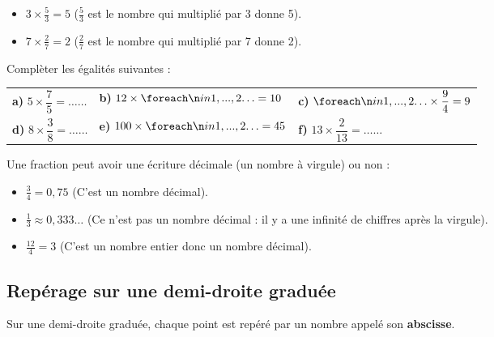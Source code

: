 \documentclass[a4paper]{book}
\begin{document}
    
    \begin{exemple}
        \begin{itemize}
            \item $3 \times \frac{5}{3} = 5$ \quad ($\frac{5}{3}$ est le nombre qui multiplié par 3 donne 5).
            \item $7 \times \frac{2}{7} = 2$ \quad ($\frac{2}{7}$ est le nombre qui multiplié par 7 donne 2).
        \end{itemize}
    \end{exemple}
    
        
    \begin{exemple}
        Complèter les égalités suivantes :
        
        \begin{center}
        \renewcommand{\arraystretch}{1.5}
        \begin{tabularx}{\textwidth}{XXX}
            \textbf{a)} $5 \times \dfrac{7}{5} = \dots\dots$ & \textbf{b)} $12 \times \points[2] = 10$ & \textbf{c)} $\points[2] \times \dfrac{9}{4} = 9$ \\[1ex]
            \textbf{d)} $8 \times \dfrac{3}{8} = \dots\dots$ & \textbf{e)} $100 \times \points[2] = 45$ & \textbf{f)} $13 \times \dfrac{2}{13} = \dots\dots$
        \end{tabularx}
        \end{center}
    \end{exemple}
    
    
    \begin{remarque}
        Une fraction peut avoir une écriture décimale (un nombre à virgule) ou non :
        \begin{itemize}
            \item $\frac{3}{4} = 0,75$ (C'est un nombre décimal).
            \item $\frac{1}{3} \approx 0,333\dots$ (Ce n'est pas un nombre décimal : il y a une infinité de chiffres après la virgule).
            \item $\frac{12}{4} = 3$ (C'est un nombre entier donc un nombre décimal).
        \end{itemize}
    \end{remarque}


\subsection{Repérage sur une demi-droite graduée}

    \begin{definition}[L'abscisse]
        Sur une demi-droite graduée, chaque point est repéré par un nombre appelé son \textbf{abscisse}. 
    \end{definition}
    
\end{document}

